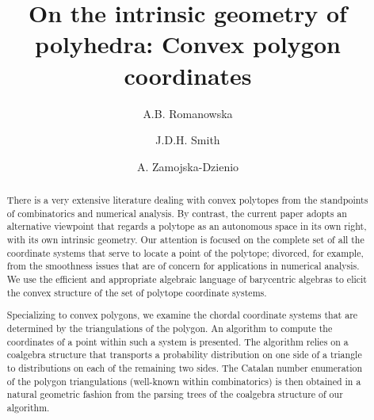 \documentclass[12pt]{amsart}
\theoremstyle{plain}
\theoremstyle{definition}
\numberwithin{equation}{section}
\begin{document}
\title[Convex polygon coordinates]{On the intrinsic geometry of polyhedra: Convex polygon coordinates}


\author[Romanowska]{A.B. Romanowska}
\author[Smith]{J.D.H. Smith}
\author[Zamojska-Dzienio]{A. Zamojska-Dzienio}
\address{(A.R., A.Z.) Faculty of Mathematics and Information Science\\
Warsaw University of Technology\\
00-662 Warsaw, Poland}


\address{(A.R., J.S.) Department of Mathematics\\
Iowa State University\\
Ames, Iowa, 50011, USA}







\begin{abstract}
There is a very extensive literature dealing with convex polytopes from the standpoints of combinatorics and numerical analysis. By contrast, the current paper adopts an alternative viewpoint that regards a polytope as an autonomous space in its own right, with its own intrinsic geometry. Our attention is focused on the complete set of all the coordinate systems that serve to locate a point of the polytope; divorced, for example, from the smoothness issues that are of concern for applications in numerical analysis. We use the efficient and appropriate algebraic language of barycentric algebras to elicit the convex structure of the set of polytope coordinate systems.


Specializing to convex polygons, we examine the chordal coordinate systems that are determined by the triangulations of the polygon. An algorithm to compute the coordinates of a point within such a system is presented. The algorithm relies on a coalgebra structure that transports a probability distribution on one side of a triangle to distributions on each of the remaining two sides. The Catalan number enumeration of the polygon triangulations (well-known within combinatorics) is then obtained in a natural geometric fashion from the parsing trees of the coalgebra structure of our algorithm.

\end{abstract}
\end{document}

